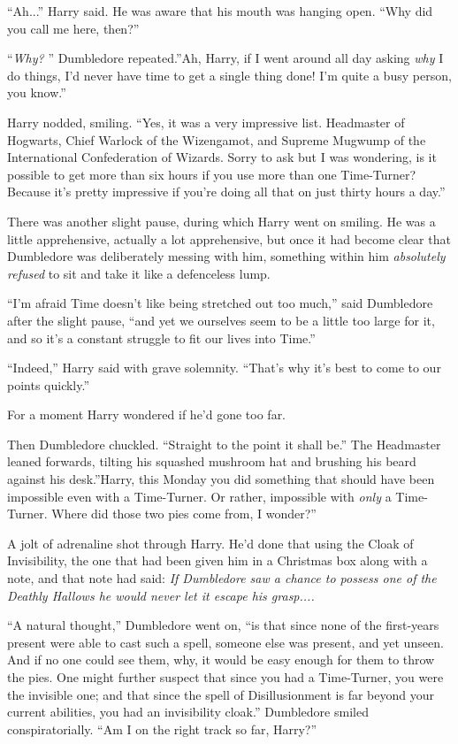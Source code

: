 ``Ah...'' Harry said. He was aware that his mouth was hanging open.
``Why did you call me here, then?''

``\emph{Why?} '' Dumbledore repeated.''Ah, Harry, if I went around all day
asking \emph{why} I do things, I'd never have time to get a single thing
done! I'm quite a busy person, you know.''

Harry nodded, smiling. ``Yes, it was a very impressive list. Headmaster
of Hogwarts, Chief Warlock of the Wizengamot, and Supreme Mugwump of the
International Confederation of Wizards. Sorry to ask but I was
wondering, is it possible to get more than six hours if you use more
than one Time-Turner? Because it's pretty impressive if you're doing all
that on just thirty hours a day.''

There was another slight pause, during which Harry went on smiling. He
was a little apprehensive, actually a lot apprehensive, but once it had
become clear that Dumbledore was deliberately messing with him,
something within him \emph{absolutely refused} to sit and take it like a
defenceless lump.

``I'm afraid Time doesn't like being stretched out too much,'' said
Dumbledore after the slight pause, ``and yet we ourselves seem to be a
little too large for it, and so it's a constant struggle to fit our
lives into Time.''

``Indeed,'' Harry said with grave solemnity. ``That's why it's best to
come to our points quickly.''

For a moment Harry wondered if he'd gone too far.

Then Dumbledore chuckled. ``Straight to the point it shall be.'' The
Headmaster leaned forwards, tilting his squashed mushroom hat and
brushing his beard against his desk.''Harry, this Monday you did
something that should have been impossible even with a Time-Turner. Or
rather, impossible with \emph{only} a Time-Turner. Where did those two
pies come from, I wonder?''

A jolt of adrenaline shot through Harry. He'd done that using the Cloak
of Invisibility, the one that had been given him in a Christmas box
along with a note, and that note had said: \emph{If Dumbledore saw a
chance to possess one of the Deathly Hallows he would never let it
escape his grasp.}\emph{...}

``A natural thought,'' Dumbledore went on, ``is that since none of the
first-years present were able to cast such a spell, someone else was
present, and yet unseen. And if no one could see them, why, it would be
easy enough for them to throw the pies. One might further suspect that
since you had a Time-Turner, you were the invisible one; and that since
the spell of Disillusionment is far beyond your current abilities, you
had an invisibility cloak.'' Dumbledore smiled conspiratorially. ``Am I
on the right track so far, Harry?''

